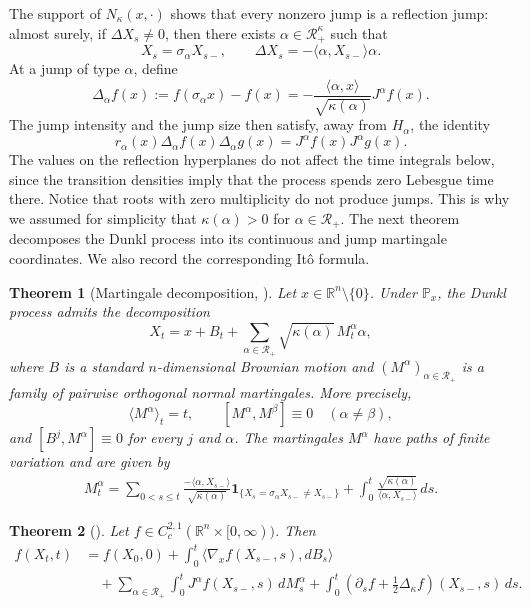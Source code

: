 \documentclass[11pt]{amsart}
\newtheorem{theorem}{Theorem}[section]
\theoremstyle{definition}
\theoremstyle{remark}
\numberwithin{equation}{section}
\newcommand{\R}{\mathbb{R}}
\newcommand{\ind}{\mathbf{1}}
\newcommand{\RR}{\mathcal{R}}
\begin{document}
The support of $N_\kappa(x,\cdot)$ shows that every nonzero jump is a reflection jump: almost surely, if $\Delta X_s\neq0$, then there exists $\alpha\in\RR_+^\kappa$ such that
\[
X_s=\sigma_\alpha X_{s-},
\qquad
\Delta X_s=-\langle\alpha,X_{s-}\rangle\alpha.
\]
At a jump of type $\alpha$, define
\[
\Delta_\alpha f(x)
:=
f(\sigma_\alpha x)-f(x)
=
-\frac{\langle\alpha,x\rangle}{\sqrt{\kappa(\alpha)}}J^\alpha f(x).
\]
The jump intensity and the jump size then satisfy, away from $H_\alpha$, the identity
\[
r_\alpha(x)\Delta_\alpha f(x)\Delta_\alpha g(x)
=
J^\alpha f(x)J^\alpha g(x).
\]
The values on the reflection hyperplanes do not affect the time integrals below, since the transition densities imply that the process spends zero Lebesgue time there.
Notice that roots with zero multiplicity do not produce jumps. This is why we assumed for simplicity that $\kappa(\alpha)>0$ for $\alpha\in\RR_+$.
The next theorem decomposes the Dunkl process into its continuous and
jump martingale coordinates. We also record the corresponding It\^o
formula.

\begin{theorem}[Martingale decomposition, \cite{GallardoYor2006_Chaotic}]
Let $x\in\R^n\setminus\{0\}$. Under $\mathbb P_x$, the Dunkl process
admits the decomposition
\begin{equation}
X_t
=
x+B_t
+
\sum_{\alpha\in\RR_+}
\sqrt{\kappa(\alpha)}\,M_t^\alpha\alpha,
\end{equation}
where $B$ is a standard $n$-dimensional Brownian motion and
$(M^\alpha)_{\alpha\in\RR_+}$ is a family of pairwise
orthogonal normal martingales. More precisely,
\[
\langle M^\alpha\rangle_t=t,
\qquad
[M^\alpha,M^\beta]\equiv0
\quad(\alpha\neq\beta),
\]
and $[B^j,M^\alpha]\equiv0$
for every $j$ and $\alpha$. The martingales $M^\alpha$ have paths of
finite variation and are given by
\begin{align*}
M_t^\alpha
=
\sum_{0<s\leq t}
\frac{-\langle\alpha,X_{s-}\rangle}{\sqrt{\kappa(\alpha)}}
\ind_{\{X_s=\sigma_\alpha X_{s-}\neq X_{s-}\}}
+
\int_0^t\frac{\sqrt{\kappa(\alpha)}}{\langle\alpha,X_{s-}\rangle}\,ds.
\end{align*}
\end{theorem}

\begin{theorem}[\cite{GallardoYor2006_Chaotic}]
Let $f\in C_c^{2,1}(\R^n\times[0,\infty))$. Then
\begin{align*}
f(X_t,t)
&=
f(X_0,0)
+
\int_0^t\langle\nabla_xf(X_{s-},s),dB_s\rangle\\
&\quad+
\sum_{\alpha\in\RR_+}\int_0^t J^\alpha f(X_{s-},s)\,dM_s^\alpha
+
\int_0^t\left(\partial_sf+\frac12\Delta_\kappa f\right)(X_{s-},s)\,ds.
\end{align*}
\end{theorem}
\end{document}
